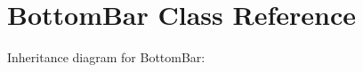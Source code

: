 \hypertarget{classBottomBar}{}\section{Bottom\+Bar Class Reference}
\label{classBottomBar}


Inheritance diagram for Bottom\+Bar\+:
